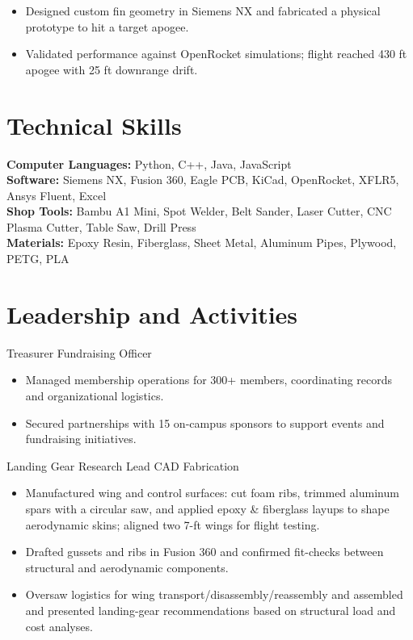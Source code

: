 \begin{itemize}
  \item Designed custom fin geometry in Siemens NX and fabricated a physical prototype to hit a target apogee.
  \item Validated performance against OpenRocket simulations; flight reached 430 ft apogee with 25 ft downrange drift.
\end{itemize}

\section{Technical Skills}
\textbf{Computer Languages:} Python, C++, Java, JavaScript\\
\textbf{Software:} Siemens NX, Fusion 360, Eagle PCB, KiCad, OpenRocket, XFLR5, Ansys Fluent, Excel\\
\textbf{Shop Tools:} Bambu A1 Mini, Spot Welder, Belt Sander, Laser Cutter, CNC Plasma Cutter, Table Saw, Drill Press\\
\textbf{Materials:} Epoxy Resin, Fiberglass, Sheet Metal, Aluminum Pipes, Plywood, PETG, PLA

\section{Leadership and Activities}

Treasurer \textbar{} Fundraising Officer
\begin{itemize}
  \item Managed membership operations for 300+ members, coordinating records and organizational logistics.
  \item Secured partnerships with 15 on-campus sponsors to support events and fundraising initiatives.
\end{itemize}
\entrygap

Landing Gear Research Lead \textbar{} CAD \textbar{} Fabrication
\begin{itemize}
  \item Manufactured wing and control surfaces: cut foam ribs, trimmed aluminum spars with a circular saw, and applied epoxy \& fiberglass layups to shape aerodynamic skins; aligned two 7-ft wings for flight testing.
  \item Drafted gussets and ribs in Fusion 360 and confirmed fit-checks between structural and aerodynamic components.
  \item Oversaw logistics for wing transport/disassembly/reassembly and assembled and presented landing-gear recommendations based on structural load and cost analyses.
\end{itemize}


